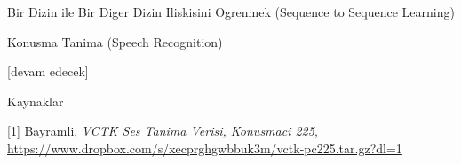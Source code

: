 \documentclass[12pt,fleqn]{article}\usepackage{../../common}
\begin{document}
Bir Dizin ile Bir Diger Dizin Iliskisini Ogrenmek (Sequence to Sequence Learning)






















Konusma Tanima (Speech Recognition)












[devam edecek]

Kaynaklar

[1] Bayramli, {\em VCTK Ses Tanima Verisi, Konusmaci 225}, \url{https://www.dropbox.com/s/xecprghgwbbuk3m/vctk-pc225.tar.gz?dl=1}
\end{document}
